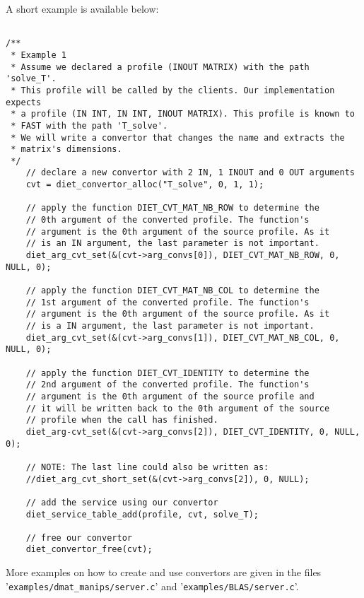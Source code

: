 \noindent A short example is available below:
\footnotesize
\begin{verbatim}

/**
 * Example 1
 * Assume we declared a profile (INOUT MATRIX) with the path 'solve_T'.
 * This profile will be called by the clients. Our implementation expects
 * a profile (IN INT, IN INT, INOUT MATRIX). This profile is known to
 * FAST with the path 'T_solve'.
 * We will write a convertor that changes the name and extracts the 
 * matrix's dimensions.
 */
    // declare a new convertor with 2 IN, 1 INOUT and 0 OUT arguments
    cvt = diet_convertor_alloc("T_solve", 0, 1, 1);

    // apply the function DIET_CVT_MAT_NB_ROW to determine the
    // 0th argument of the converted profile. The function's
    // argument is the 0th argument of the source profile. As it
    // is an IN argument, the last parameter is not important.
    diet_arg_cvt_set(&(cvt->arg_convs[0]), DIET_CVT_MAT_NB_ROW, 0, NULL, 0);

    // apply the function DIET_CVT_MAT_NB_COL to determine the
    // 1st argument of the converted profile. The function's
    // argument is the 0th argument of the source profile. As it
    // is a IN argument, the last parameter is not important.
    diet_arg_cvt_set(&(cvt->arg_convs[1]), DIET_CVT_MAT_NB_COL, 0, NULL, 0);

    // apply the function DIET_CVT_IDENTITY to determine the
    // 2nd argument of the converted profile. The function's
    // argument is the 0th argument of the source profile and
    // it will be written back to the 0th argument of the source
    // profile when the call has finished.
    diet_arg-cvt_set(&(cvt->arg_convs[2]), DIET_CVT_IDENTITY, 0, NULL, 0);

    // NOTE: The last line could also be written as:
    //diet_arg_cvt_short_set(&(cvt->arg_convs[2]), 0, NULL);

    // add the service using our convertor
    diet_service_table_add(profile, cvt, solve_T);

    // free our convertor
    diet_convertor_free(cvt);
\end{verbatim}
\normalsize

\noindent More examples on how to create and use convertors are given in the
files \\
'\texttt{examples/dmat\_manips/server.c}' and '\texttt{examples/BLAS/server.c}'.

